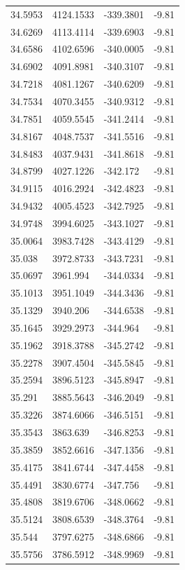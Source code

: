 \begin{table}[H]
\begin{tabular}{llll}
34.5953 & 4124.1533 & -339.3801 & -9.81 \\
34.6269 & 4113.4114 & -339.6903 & -9.81 \\
34.6586 & 4102.6596 & -340.0005 & -9.81 \\
34.6902 & 4091.8981 & -340.3107 & -9.81 \\
34.7218 & 4081.1267 & -340.6209 & -9.81 \\
34.7534 & 4070.3455 & -340.9312 & -9.81 \\
34.7851 & 4059.5545 & -341.2414 & -9.81 \\
34.8167 & 4048.7537 & -341.5516 & -9.81 \\
34.8483 & 4037.9431 & -341.8618 & -9.81 \\
34.8799 & 4027.1226 & -342.172 & -9.81 \\
34.9115 & 4016.2924 & -342.4823 & -9.81 \\
34.9432 & 4005.4523 & -342.7925 & -9.81 \\
34.9748 & 3994.6025 & -343.1027 & -9.81 \\
35.0064 & 3983.7428 & -343.4129 & -9.81 \\
35.038 & 3972.8733 & -343.7231 & -9.81 \\
35.0697 & 3961.994 & -344.0334 & -9.81 \\
35.1013 & 3951.1049 & -344.3436 & -9.81 \\
35.1329 & 3940.206 & -344.6538 & -9.81 \\
35.1645 & 3929.2973 & -344.964 & -9.81 \\
35.1962 & 3918.3788 & -345.2742 & -9.81 \\
35.2278 & 3907.4504 & -345.5845 & -9.81 \\
35.2594 & 3896.5123 & -345.8947 & -9.81 \\
35.291 & 3885.5643 & -346.2049 & -9.81 \\
35.3226 & 3874.6066 & -346.5151 & -9.81 \\
35.3543 & 3863.639 & -346.8253 & -9.81 \\
35.3859 & 3852.6616 & -347.1356 & -9.81 \\
35.4175 & 3841.6744 & -347.4458 & -9.81 \\
35.4491 & 3830.6774 & -347.756 & -9.81 \\
35.4808 & 3819.6706 & -348.0662 & -9.81 \\
35.5124 & 3808.6539 & -348.3764 & -9.81 \\
35.544 & 3797.6275 & -348.6866 & -9.81 \\
35.5756 & 3786.5912 & -348.9969 & -9.81 \\

\end{tabular}
\end{table}
